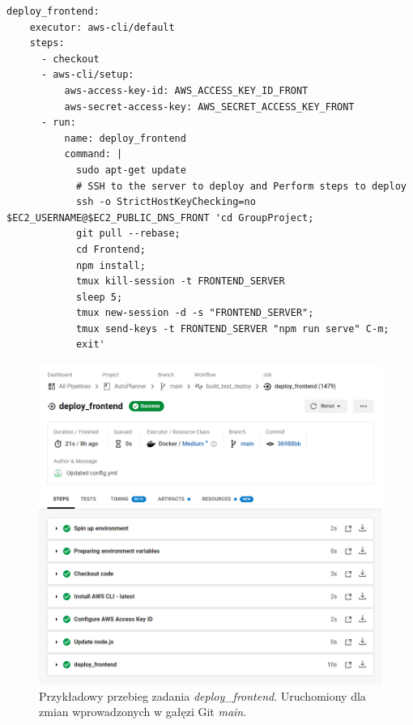 \begin{lstlisting}[caption=Część skryptu config.yml odpowiadająca za wykonanie zadania \textit{deploy\_frontend},label={lst:deploy_front}]
deploy_frontend:
    executor: aws-cli/default
    steps:
      - checkout
      - aws-cli/setup:
          aws-access-key-id: AWS_ACCESS_KEY_ID_FRONT
          aws-secret-access-key: AWS_SECRET_ACCESS_KEY_FRONT
      - run:
          name: deploy_frontend
          command: |
            sudo apt-get update
            # SSH to the server to deploy and Perform steps to deploy
            ssh -o StrictHostKeyChecking=no $EC2_USERNAME@$EC2_PUBLIC_DNS_FRONT 'cd GroupProject; 
            git pull --rebase;
            cd Frontend;
            npm install;
            tmux kill-session -t FRONTEND_SERVER
            sleep 5;
            tmux new-session -d -s "FRONTEND_SERVER";
            tmux send-keys -t FRONTEND_SERVER "npm run serve" C-m;
            exit'
\end{lstlisting}
\newpage
\begin{figure}[H]
\centering\includegraphics[width=14cm]{figures/circleci_deploy_front}
\caption{Przykładowy przebieg zadania \textit{deploy\_frontend}. Uruchomiony dla zmian wprowadzonych w gałęzi Git \textit{main}.}\label{rys:deploy_front}
\end{figure}


